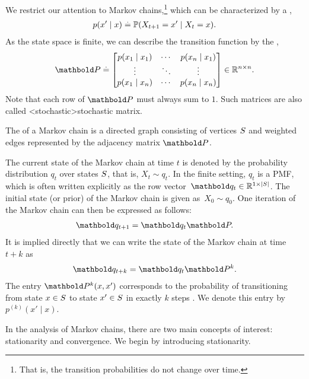 We restrict our attention to  Markov chains,\footnote{That is, the transition probabilities do not change over time.} which can be characterized by a , \begin{align}
  p(x' \mid x) \defeq \Pr{X_{t+1} = x' \mid X_t = x}.
\end{align}
As the state space is finite, we can describe the transition function by the , \begin{align}
  \mP \defeq \begin{bmatrix}
    p(x_1 \mid x_1) & \cdots & p(x_n \mid x_1) \\
    \vdots & \ddots & \vdots \\
    p(x_1 \mid x_n) & \cdots & p(x_n \mid x_n) \\
  \end{bmatrix} \in \R^{n \times n}. \label{eq:transition_matrix}
\end{align}
Note that each row of $\mP$ must always sum to $1$.
Such matrices are also called \midx<stochastic>{stochastic matrix}.

The  of a Markov chain is a directed graph consisting of vertices $S$ and weighted edges represented by the adjacency matrix $\mP$.

The current state of the Markov chain at time $t$ is denoted by the probability distribution $q_t$ over states $S$, that is, $X_t \sim q_t$. In the finite setting, $q_t$ is a PMF, which is often written explicitly as the row vector~${\vq_t \in \R^{1 \times \card{\sS}}}$.
The initial state (or prior) of the Markov chain is given as~${X_0 \sim q_0}$.
One iteration of the Markov chain can then be expressed as follows:~ \begin{align}
  \vq_{t+1} = \vq_t \mP. \label{eq:mc_update}
\end{align}
It is implied directly that we can write the state of the Markov chain at time $t + k$ as \begin{align}
  \vq_{t+k} = \vq_t \mP^k.
\end{align}
The entry $\mP^k(x,x')$ corresponds to the probability of transitioning from state $x \in S$ to state $x' \in S$ in exactly $k$ steps .
We denote this entry by $p^{(k)}(x' \mid x)$.

In the analysis of Markov chains, there are two main concepts of interest: stationarity and convergence.
We begin by introducing stationarity.

